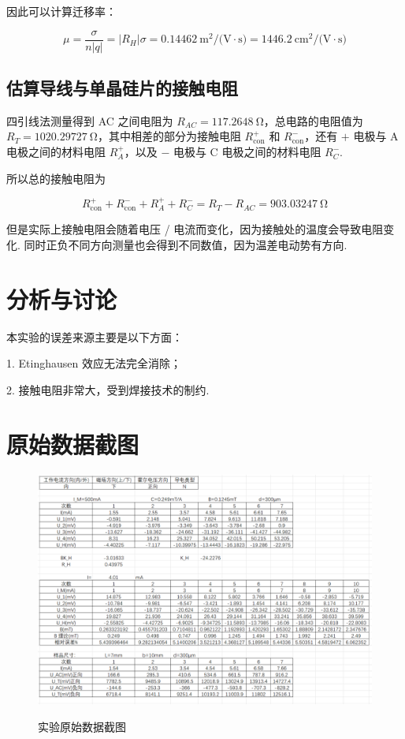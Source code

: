 \documentclass{customDoc}
\begin{document}
因此可以计算迁移率：

\begin{equation}
    \mu = \frac{\sigma}{n|q|} = |R_H|\sigma = \SI{0.14462}{\meter^2/(\volt\cdot\second)} = \SI{1446.2}{\centi\meter^2/(\volt\cdot\second)}
\end{equation}

\subsection{估算导线与单晶硅片的接触电阻}

四引线法测量得到 AC 之间电阻为 $R_{AC} = \SI{117.2648}{\ohm}$，总电路的电阻值为 $R_T = \SI{1020.29727}{\ohm}$，其中相差的部分为接触电阻 $R_{\text{con}}^+$ 和 $R_{\text{con}}^-$，还有 $+$ 电极与 A 电极之间的材料电阻 $R_A^+$，以及 $-$ 电极与 C 电极之间的材料电阻 $R_C^-$.

所以总的接触电阻为

\begin{equation}
    R_{\text{con}}^+ + R_{\text{con}}^- + R_A^+ + R_C^- = R_T - R_{AC} = \SI{903.03247}{\ohm}
\end{equation}

但是实际上接触电阻会随着电压 / 电流而变化，因为接触处的温度会导致电阻变化. 同时正负不同方向测量也会得到不同数值，因为温差电动势有方向.

\section{分析与讨论}

本实验的误差来源主要是以下方面：\newline

1. Etinghausen 效应无法完全消除；

2. 接触电阻非常大，受到焊接技术的制约.

\section{原始数据截图}

\begin{figure}[h]
    \caption{实验原始数据截图}
    \centering
    \includegraphics[scale=0.3]{1.png}
    \label{fig:data}
\end{figure}
\end{document}
